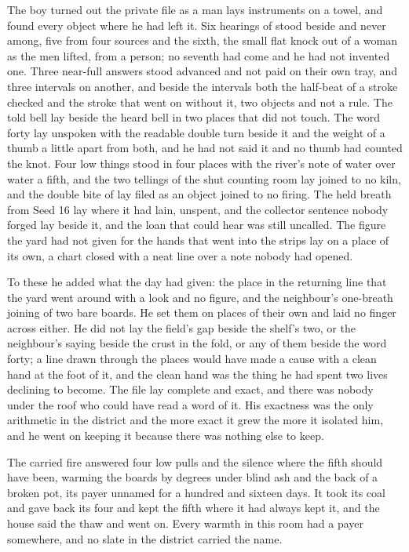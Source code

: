 The boy turned out the private file as a man lays instruments on a towel, and found every object where he had left it. Six hearings of  stood beside and never among, five from four sources and the sixth, the small flat knock out of a woman as the men lifted, from a person; no seventh had come and he had not invented one. Three near-full answers stood advanced and not paid on their own tray, and three intervals on another, and beside the intervals both the half-beat of a stroke checked and the stroke that went on without it, two objects and not a rule. The told bell lay beside the heard bell in two places that did not touch. The word forty lay unspoken with the readable double turn beside it and the weight of a thumb a little apart from both, and he had not said it and no thumb had counted the knot. Four low things stood in four places with the river’s note of water over water a fifth, and the two tellings of the shut counting room lay joined to no kiln, and the double bite of  lay filed as an object joined to no firing. The held breath from Seed 16 lay where it had lain, unspent, and the collector sentence nobody forged lay beside it, and the loan that could hear was still uncalled. The figure the yard had not given for the hands that went into the strips lay on a place of its own, a chart closed with a neat line over a note nobody had opened.

To these he added what the day had given: the place in the returning line that the yard went around with a look and no figure, and the neighbour’s one-breath joining of two bare boards. He set them on places of their own and laid no finger across either. He did not lay the field’s gap beside the shelf’s two, or the neighbour’s saying beside the crust in the fold, or any of them beside the word forty; a line drawn through the places would have made a cause with a clean hand at the foot of it, and the clean hand was the thing he had spent two lives declining to become. The file lay complete and exact, and there was nobody under the roof who could have read a word of it. His exactness was the only arithmetic in the district and the more exact it grew the more it isolated him, and he went on keeping it because there was nothing else to keep.

The carried fire answered four low pulls and the silence where the fifth should have been, warming the boards by degrees under blind ash and the back of a broken pot, its payer unnamed for a hundred and sixteen days. It took its coal and gave back its four and kept the fifth where it had always kept it, and the house said the thaw and went on. Every warmth in this room had a payer somewhere, and no slate in the district carried the name.

